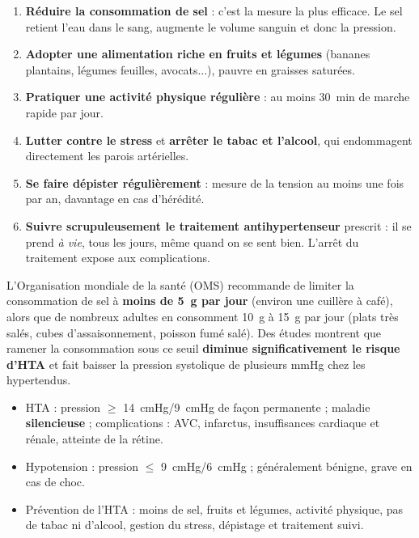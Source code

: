 \documentclass[11pt]{article}
\begin{document}
\begin{enumerate}
\item \textbf{Réduire la consommation de sel} : c'est la mesure la plus efficace. Le sel retient l'eau dans le sang, augmente le volume sanguin et donc la pression.
\item \textbf{Adopter une alimentation riche en fruits et légumes} (bananes plantains, légumes feuilles, avocats...), pauvre en graisses saturées.
\item \textbf{Pratiquer une activité physique régulière} : au moins \SI{30}{min} de marche rapide par jour.
\item \textbf{Lutter contre le stress} et \textbf{arrêter le tabac et l'alcool}, qui endommagent directement les parois artérielles.
\item \textbf{Se faire dépister régulièrement} : mesure de la tension au moins une fois par an, davantage en cas d'hérédité.
\item \textbf{Suivre scrupuleusement le traitement antihypertenseur} prescrit : il se prend \emph{à vie}, tous les jours, même quand on se sent bien. L'arrêt du traitement expose aux complications.
\end{enumerate}

\begin{exemplebox}
L'Organisation mondiale de la santé (OMS) recommande de limiter la consommation de sel à \textbf{moins de \SI{5}{g} par jour} (environ une cuillère à café), alors que de nombreux adultes en consomment \SI{10}{g} à \SI{15}{g} par jour (plats très salés, cubes d'assaisonnement, poisson fumé salé). Des études montrent que ramener la consommation sous ce seuil \textbf{diminue significativement le risque d'HTA} et fait baisser la pression systolique de plusieurs mmHg chez les hypertendus.
\end{exemplebox}

\begin{aretenir}[L'essentiel]
\begin{itemize}
\item HTA : pression $\geq$ \SI{14}{cmHg}/\SI{9}{cmHg} de façon permanente ; maladie \textbf{silencieuse} ; complications : AVC, infarctus, insuffisances cardiaque et rénale, atteinte de la rétine.
\item Hypotension : pression $\leq$ \SI{9}{cmHg}/\SI{6}{cmHg} ; généralement bénigne, grave en cas de choc.
\item Prévention de l'HTA : moins de sel, fruits et légumes, activité physique, pas de tabac ni d'alcool, gestion du stress, dépistage et traitement suivi.
\end{itemize}
\end{aretenir}
\end{document}
